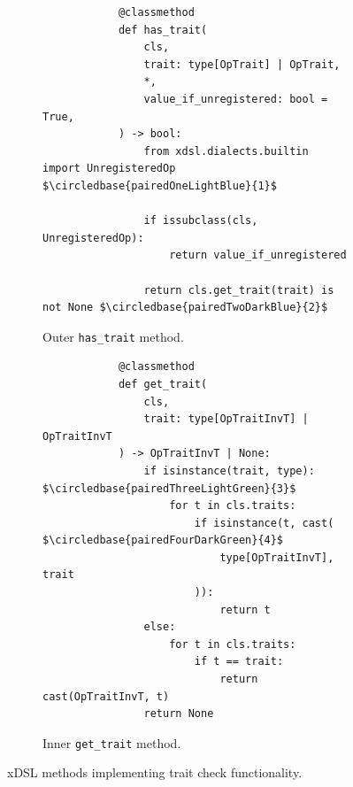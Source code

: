 \begin{figure}[H]
    \begin{subfigure}[b]{0.45\textwidth}
       \centering
        \begin{verbatim}
            @classmethod
            def has_trait(
                cls,
                trait: type[OpTrait] | OpTrait,
                *,
                value_if_unregistered: bool = True,
            ) -> bool:
                from xdsl.dialects.builtin import UnregisteredOp $\circledbase{pairedOneLightBlue}{1}$

                if issubclass(cls, UnregisteredOp):
                    return value_if_unregistered

                return cls.get_trait(trait) is not None $\circledbase{pairedTwoDarkBlue}{2}$
        \end{verbatim}
        \footnotesize\vspace{1.5em}
        \caption{Outer \texttt{has_trait} method.}
        \label{listing:ubenchmark-trait-checks-xdsl-has}
    \end{subfigure}
    \hfill
    \begin{subfigure}[b]{0.45\textwidth}
        \centering
        \begin{verbatim}
            @classmethod
            def get_trait(
                cls,
                trait: type[OpTraitInvT] | OpTraitInvT
            ) -> OpTraitInvT | None:
                if isinstance(trait, type): $\circledbase{pairedThreeLightGreen}{3}$
                    for t in cls.traits:
                        if isinstance(t, cast( $\circledbase{pairedFourDarkGreen}{4}$
                            type[OpTraitInvT], trait
                        )):
                            return t
                else:
                    for t in cls.traits:
                        if t == trait:
                            return cast(OpTraitInvT, t)
                return None
        \end{verbatim}
        \caption{Inner \texttt{get_trait} method.}
        \label{listing:ubenchmark-trait-checks-xdsl-get}
    \end{subfigure}
    \vspace{1em}
    \captionsetup{name=Listing}
    \caption{xDSL methods implementing trait check functionality.}
    \label{listing:ubenchmark-trait-checks-xdsl}
\end{figure}

